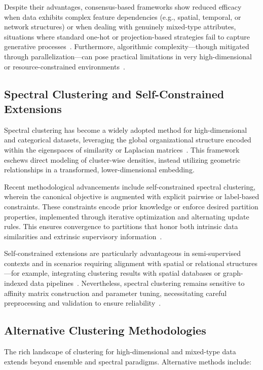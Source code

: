 \documentclass[sigconf]{acmart}
\begin{document}
Despite their advantages, consensus-based frameworks show reduced efficacy when data exhibits complex feature dependencies (e.g., spatial, temporal, or network structures) or when dealing with genuinely mixed-type attributes, situations where standard one-hot or projection-based strategies fail to capture generative processes~\cite{ref116}. Furthermore, algorithmic complexity—though mitigated through parallelization—can pose practical limitations in very high-dimensional or resource-constrained environments~\cite{ref116}.

\subsection{Spectral Clustering and Self-Constrained Extensions}

Spectral clustering has become a widely adopted method for high-dimensional and categorical datasets, leveraging the global organizational structure encoded within the eigenspaces of similarity or Laplacian matrices~\cite{ref36,ref117}. This framework eschews direct modeling of cluster-wise densities, instead utilizing geometric relationships in a transformed, lower-dimensional embedding.

Recent methodological advancements include self-constrained spectral clustering, wherein the canonical objective is augmented with explicit pairwise or label-based constraints. These constraints encode prior knowledge or enforce desired partition properties, implemented through iterative optimization and alternating update rules. This ensures convergence to partitions that honor both intrinsic data similarities and extrinsic supervisory information~\cite{ref117}.

Self-constrained extensions are particularly advantageous in semi-supervised contexts and in scenarios requiring alignment with spatial or relational structures—for example, integrating clustering results with spatial databases or graph-indexed data pipelines~\cite{ref117}. Nevertheless, spectral clustering remains sensitive to affinity matrix construction and parameter tuning, necessitating careful preprocessing and validation to ensure reliability~\cite{ref36,ref117}.

\subsection{Alternative Clustering Methodologies}

The rich landscape of clustering for high-dimensional and mixed-type data extends beyond ensemble and spectral paradigms. Alternative methods include:
\end{document}
